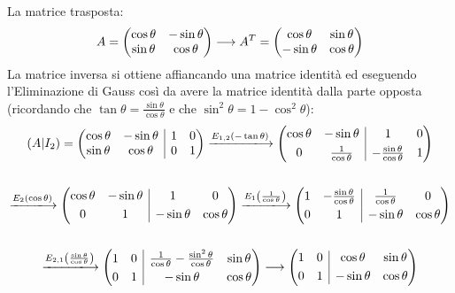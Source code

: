\documentclass[a4paper]{article}
\makeatletter
\newenvironment{rowequmat}[1]{\left(\array{@{}#1@{}}}{\endarray\right)}
\makeatother
\begin{document}
	\noindent
	La matrice trasposta:
	\begin{equation*}
		A = \begin{rowequmat}{cc}
			\cos\theta & -\sin\theta \\
			\sin\theta & \cos\theta
		\end{rowequmat} \longrightarrow
		A^{T} = \begin{rowequmat}{cc}
			\cos\theta & \sin\theta \\
			-\sin\theta & \cos\theta
		\end{rowequmat}
	\end{equation*}
	La matrice inversa si ottiene affiancando una matrice identità ed eseguendo l'Eliminazione di Gauss così da avere la matrice identità dalla parte opposta (ricordando che $\tan\theta = \frac{\sin\theta}{\cos\theta}$ e che $\sin^{2}\theta = 1-\cos^{2}\theta$):
	\begin{gather*}
		\left(A|I_{2}\right) = \begin{rowequmat}{cc|cc}
			\cos\theta & -\sin\theta & 1 & 0 \\
			\sin\theta & \cos\theta  & 0 & 1
		\end{rowequmat} \xlongrightarrow{E_{1,2}\left(-\tan\theta\right)}
		\begin{rowequmat}{cc|cc}
			\cos\theta & -\sin\theta & 1 & 0 \\ [0.3em]
			0 & \frac{1}{\cos\theta}  & -\frac{\sin\theta}{\cos\theta} & 1
		\end{rowequmat} \\
		\\
		\xlongrightarrow{E_{2}\left(\cos\theta\right)}
		\begin{rowequmat}{cc|cc}
			\cos\theta & -\sin\theta & 1 & 0 \\ [0.3em]
			0 & 1  & -\sin\theta & \cos\theta
		\end{rowequmat} \xlongrightarrow{E_{1}\left(\frac{1}{\cos\theta}\right)}
		\begin{rowequmat}{cc|cc}
			1 & -\frac{\sin\theta}{\cos\theta} & \frac{1}{\cos\theta} & 0 \\ [0.3em]
			0 & 1  & -\sin\theta & \cos\theta
		\end{rowequmat} \\
		\\
		\xlongrightarrow{E_{2,1}\left(\frac{\sin\theta}{\cos\theta}\right)}
		\begin{rowequmat}{cc|cc}
			1 & 0 & \frac{1}{\cos\theta} - \frac{\sin^{2}\theta}{\cos\theta} & \sin\theta \\ [0.3em]
			0 & 1  & -\sin\theta & \cos\theta
		\end{rowequmat} \longrightarrow 
		\begin{rowequmat}{cc|cc}
			1 & 0 & \cos\theta & \sin\theta \\ [0.3em]
			0 & 1  & -\sin\theta & \cos\theta
		\end{rowequmat}
	\end{gather*}
\end{document}
